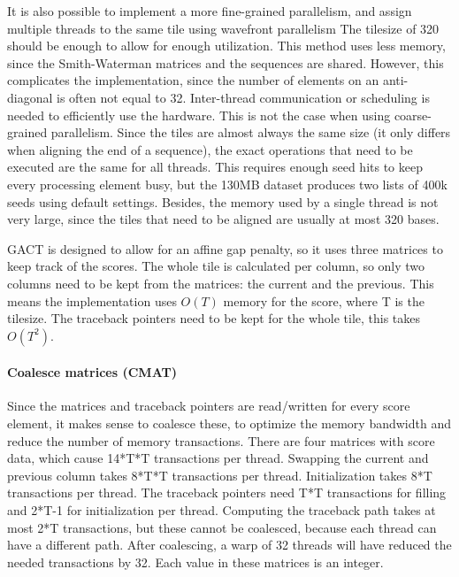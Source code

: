 \documentclass[../main/thesis.tex]{subfiles}
\begin{document}
It is also possible to implement a more fine-grained parallelism, and assign multiple threads to the same tile using wavefront parallelism 
The tilesize of 320 should be enough to allow for enough utilization.
This method uses less memory, since the Smith-Waterman matrices and the sequences are shared.
However, this complicates the implementation, since the number of elements on an anti-diagonal is often not equal to 32.
Inter-thread communication or scheduling is needed to efficiently use the hardware.
This is not the case when using coarse-grained parallelism.
Since the tiles are almost always the same size (it only differs when aligning the end of a sequence), the exact operations that need to be executed are the same for all threads.
This requires enough seed hits to keep every processing element busy, but the 130MB dataset produces two lists of 400k seeds using default settings. 
Besides, the memory used by a single thread is not very large, since the tiles that need to be aligned are usually at most 320 bases.

GACT is designed to allow for an affine gap penalty, so it uses three matrices to keep track of the scores.
The whole tile is calculated per column, so only two columns need to be kept from the matrices: the current and the previous.
This means the implementation uses $O(T)$ memory for the score, where T is the tilesize.
The traceback pointers need to be kept for the whole tile, this takes $O(T^2)$.

\paragraph{Coalesce matrices (CMAT)}
Since the matrices and traceback pointers are read/written for every score element, it makes sense to coalesce these, to optimize the memory bandwidth and reduce the number of memory transactions.
There are four matrices with score data, which cause 14*T*T transactions per thread.
Swapping the current and previous column takes 8*T*T transactions per thread. 
Initialization takes 8*T transactions per thread.
The traceback pointers need T*T transactions for filling and 2*T-1 for initialization per thread.
Computing the traceback path takes at most 2*T transactions, but these cannot be coalesced, because each thread can have a different path.
After coalescing, a warp of 32 threads will have reduced the needed transactions by 32.
Each value in these matrices is an integer.
\end{document}
